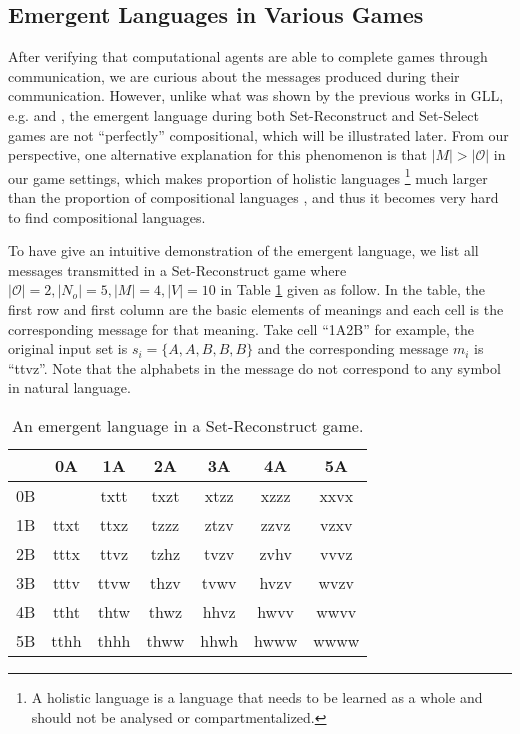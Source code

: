 \subsection{Emergent Languages in Various Games}
\label{ssec4.2.1:emergent_languages}

After verifying that computational agents are able to complete games through communication, we are curious about the messages produced during their communication. However, unlike what was shown by the previous works in GLL, e.g. \cite{hill2017understanding} and \cite{mordatch2018emergence}, the emergent language during both Set-Reconstruct and Set-Select games are not ``perfectly'' compositional, which will be illustrated later. From our perspective, one alternative explanation for this phenomenon is that $|M| > |\mathcal{O}|$ in our game settings, which makes proportion of holistic languages \footnote{A holistic language is a language that needs to be learned as a whole and should not be analysed or compartmentalized.} much larger than the proportion of compositional languages \cite{brighton2002compositional}, and thus it becomes very hard to find compositional languages.

To have give an intuitive demonstration of the emergent language, we list all messages transmitted in a Set-Reconstruct game where $|\mathcal{O}|=2, |N_o|=5, |M|=4, |V|=10$ in Table \ref{tab4.2:emregent_language_generation} given as follow. In the table, the first row and first column are the basic elements of meanings and each cell is the corresponding message for that meaning. Take cell ``1A2B'' for example, the original input set is $s_i=\{A,A,B,B,B\}$ and the corresponding message $m_i$ is ``ttvz''. Note that the alphabets in the message do not correspond to any symbol in natural language.

\begin{table}[!h]
    \centering
    \begin{tabular}{|c|c|c|c|c|c|c|}
        \hline
           & 0A   & 1A   & 2A   & 3A   & 4A   & 5A   \\ \hline
        0B &      & txtt & txzt & xtzz & xzzz & xxvx \\ \hline
        1B & ttxt & ttxz & tzzz & ztzv & zzvz & vzxv \\ \hline
        2B & tttx & ttvz & tzhz & tvzv & zvhv & vvvz \\ \hline
        3B & tttv & ttvw & thzv & tvwv & hvzv & wvzv \\ \hline
        4B & ttht & thtw & thwz & hhvz & hwvv & wwvv \\ \hline
        5B & tthh & thhh & thww & hhwh & hwww & wwww \\ \hline
        \end{tabular}
    \caption{An emergent language in a Set-Reconstruct game.}
    \label{tab4.2:emregent_language_generation}
\end{table}


